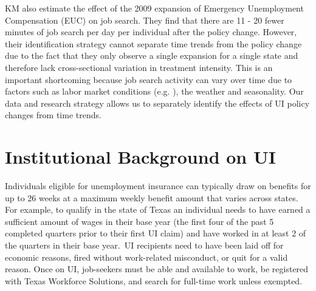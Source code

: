 \documentclass[12pt]{article}
\begin{document}
\begin{spacing}{2}
KM also estimate the effect of the 2009 expansion of Emergency Unemployment Compensation (EUC) on job search. They find that there are 11 - 20 fewer minutes of job search per day per individual after the policy change. However, their identification strategy cannot separate time trends from the policy change due to the fact that they only observe a single expansion for a single state and therefore lack cross-sectional variation in treatment intensity. This is an important shortcoming because job search activity can vary over time due to factors such as labor market conditions (e.g. \citet{Schmieder2012}), the weather and seasonality. Our data and research strategy allows us to separately identify the effects of UI policy changes from time trends.




\section{Institutional Background on UI}
Individuals eligible for unemployment insurance can typically draw on benefits for up to 26 weeks at a maximum weekly benefit amount that varies across states. For example, to qualify in the state of Texas an individual needs to have earned a sufficient amount of wages in their base year (the first four of the past 5 completed quarters prior to their first UI claim) and have worked in at least 2 of the quarters in their base year.\footnotemark \ UI recipients need to have been laid off for economic reasons, fired without work-related misconduct, or quit for a valid reason. Once on UI, job-seekers must be able and available to work, be registered with Texas Workforce Solutions, and search for full-time work unless exempted.


\end{spacing}
\end{document}
